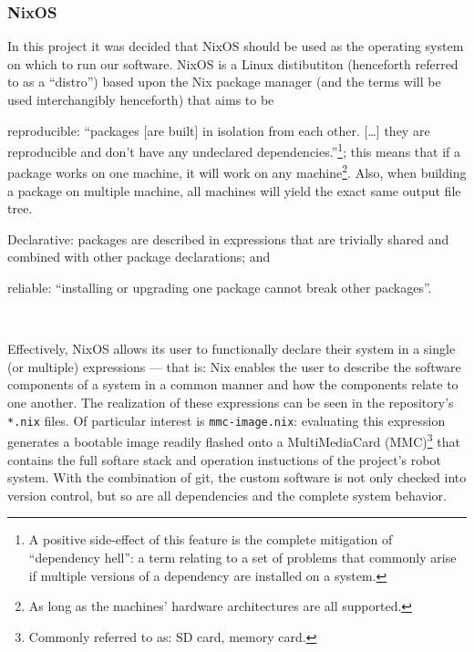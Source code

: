 \subsubsection{NixOS}
In this project it was decided that NixOS should be used as the operating system on which to run our software.
NixOS is a Linux distibutiton (henceforth referred to as a ``distro'') based upon the Nix package manager (and the terms will be used interchangibly henceforth) that aims to be
\begin{inline-enum}
\item reproducible:
  ``packages [are built] in isolation from each other. [\ldots] they are reproducible and don't have any undeclared dependencies.''\footnote{A positive side-effect of this feature is the complete mitigation of ``dependency hell'': a term relating to a set of problems that commonly arise if multiple versions of a dependency are installed on a system.};
  this means that if a package works on one machine, it will work on any machine\footnote{As long as the machines' hardware architectures are all supported.}.
  Also, when building a package on multiple machine, all machines will yield the exact same output file tree.
\item Declarative:
  packages are described in expressions that are trivially shared and combined with other package declarations; and
\item reliable:
  ``installing or upgrading one package cannot break other packages''.
\end{inline-enum}~\parencite{nixos.org}

Effectively, NixOS allows its user to functionally declare their system in a single (or multiple) expressions ---
that is: Nix enables the user to describe the software components of a system in a common manner and how the components relate to one another.
The realization of these expressions can be seen in the repository's \texttt{*.nix} files.
Of particular interest is \texttt{mmc-image.nix}: evaluating this expression generates a bootable image readily flashed onto a MultiMediaCard (MMC)\footnote{Commonly referred to as: SD card, memory card.} that contains the full softare stack and operation instuctions of the project's robot system.
With the combination of git, the custom software is not only checked into version control, but so are all dependencies and the complete system behavior.

